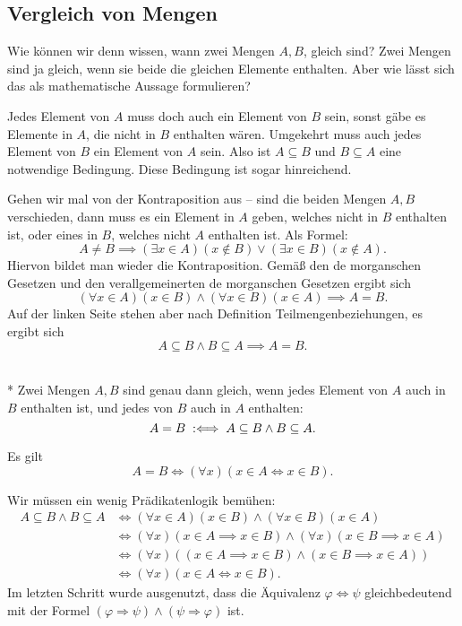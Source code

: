\subsection{Vergleich von Mengen}

Wie können wir denn wissen, wann zwei Mengen $A,B$, gleich sind?
Zwei Mengen sind ja gleich, wenn sie beide die gleichen Elemente
enthalten. Aber wie lässt sich das als mathematische Aussage
formulieren?

Jedes Element von $A$ muss doch auch ein Element von $B$ sein,
sonst gäbe es Elemente in $A$, die nicht in $B$ enthalten wären.
Umgekehrt muss auch jedes Element von $B$ ein Element von $A$ sein.
Also ist $A\subseteq B$ und $B\subseteq A$ eine notwendige Bedingung.
Diese Bedingung ist sogar hinreichend.

Gehen wir mal von der Kontraposition aus -- sind die beiden Mengen
$A,B$ verschieden, dann muss es ein Element in $A$ geben, welches nicht
in $B$ enthalten ist, oder eines in $B$, welches nicht $A$ enthalten
ist. Als Formel:%
\[A\ne B \implies (\exists x\in A)(x\notin B)\lor(\exists x\in B)(x\notin A).\]
Hiervon bildet man wieder die Kontraposition. Gemäß den
de morganschen Gesetzen und den verallgemeinerten
de morganschen Gesetzen ergibt sich%
\[(\forall x\in A)(x\in B)\land(\forall x\in B)(x\in A)\implies A=B.\]
Auf der linken Seite stehen aber nach Definition
Teilmengenbeziehungen, es ergibt sich%
\[A\subseteq B\land B\subseteq A\implies A=B.\]
\begin{Definition}%
\mbox{}\\*
Zwei Mengen $A,B$ sind genau dann gleich, wenn jedes Element von
$A$ auch in $B$ enthalten ist, und jedes von $B$ auch in $A$ enthalten:%
\[A=B\;:\Longleftrightarrow\; A\subseteq B\land B\subseteq A.\]
\end{Definition}
\begin{Satz}\label{set-eq}
Es gilt
\[A=B\iff (\forall x)(x\in A\iff x\in B).\]
\end{Satz}
 Wir müssen ein wenig Prädikatenlogik bemühen:%
\begin{align*}
A\subseteq B\land B\subseteq A
&\iff (\forall x\in A)(x\in B)\land(\forall x\in B)(x\in A)\\
&\iff (\forall x)(x\in A\implies x\in B)\land(\forall x)(x\in B\implies x\in A)\\
&\iff (\forall x)((x\in A\implies x\in B)\land (x\in B\implies x\in A))\\
&\iff (\forall x)(x\in A\iff x\in B).
\end{align*}
Im letzten Schritt wurde ausgenutzt, dass die Äquivalenz
$\varphi\Leftrightarrow\psi$ gleichbedeutend
mit der Formel $(\varphi\Rightarrow\psi)\land(\psi\Rightarrow\varphi)$
ist.\;\qedsymbol

